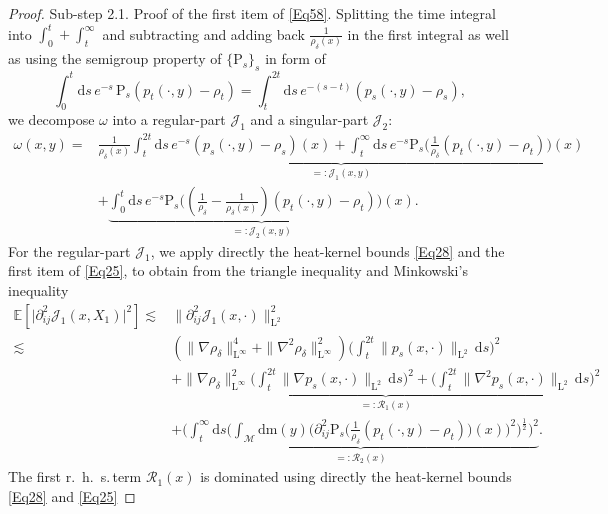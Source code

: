 \documentclass[11pt,a4paper,oneside]{amsart}
\numberwithin{equation}{section}
\newcommand{\dd}{\mathrm{d}}
\newcommand{\LL}{\mathrm{L}}
\newcommand{\rhs}{r.~h.~s.\,}
\newcommand{\pp}{\mathrm{P}}
\newcommand{\m}{\mathrm{m}}
\begin{document}
\begin{proof}
%
\medskip
%

{\sc Sub-step 2.1. Proof of the first item of \eqref{Eq58}. }Splitting the time integral into $\int_{0}^t+\int_{t}^\infty$ and subtracting and adding back $\tfrac{1}{\rho_\delta(x)}$ in the first integral as well as using the semigroup property of $\{\pp_s\}_{s}$ in form of 
%
$$\int_0^t\dd s\, e^{-s}\,\pp_s(p_t(\cdot,y)-\rho_t)=\int_{t}^{2t}\dd s\, e^{-(s-t)}(p_s(\cdot,y)-\rho_s),$$
%
we decompose $\omega$ into a regular-part $\mathcal{J}_1$ and a singular-part $\mathcal{J}_2$: 
%
\begin{equation}\label{Eq68}
\begin{aligned}
\omega(x,y)=&\underbrace{\frac{1}{\rho_{\delta}(x)}\int_t^{2t} \dd s\, e^{-s}(p_s(\cdot,y)-\rho_{s})(x)
+\int_{t}^{\infty}\dd s\, e^{-s}\text{P}_s\Big(\tfrac{1}{\rho_\delta}(p_t(\cdot,y)-\rho_t)\Big)(x)}_{=:\mathcal{J}_1(x,y)}\\
&+\underbrace{\int_{0}^{t}\dd s\, e^{-s}\text{P}_s\Big((\tfrac{1}{\rho_\delta}-\tfrac{1}{\rho_\delta(x)})(p_t(\cdot,y)-\rho_t)\Big)(x)}_{=:\mathcal{J}_2(x,y)}.
\end{aligned}
\end{equation}
%
For the regular-part $\mathcal{J}_1$, we apply directly the heat-kernel bounds \eqref{Eq28} and the first item of \eqref{Eq25}, to obtain from the triangle inequality and Minkowski's inequality
%
\begin{equation}\label{Eq61}
\begin{aligned}
\mathbb{E}[\vert\partial^2_{ij}\mathcal{J}_1(x,X_1)\vert^2]\lesssim& \|\partial^2_{ij}\mathcal{J}_1(x,\cdot)\|^2_{\LL^{2}}\\
\lesssim &(\|\nabla\rho_{\delta}\|^4_{\LL^{\infty}}+\|\nabla^2\rho_{\delta}\|^2_{\LL^{\infty}})\Big(\int_{t}^{2t}\|p_s(x,\cdot)\|_{\LL^{2}}\,\dd s\Big)^{2}\\
&\underbrace{+\|\nabla\rho_{\delta}\|^2_{\LL^{\infty}}\Big(\int_{t}^{2t}\|\nabla p_s(x,\cdot)\|_{\LL^{2}}\,\dd s\Big)^{2}+\Big(\int_{t}^{2t}\|\nabla^2 p_s(x,\cdot)\|_{\LL^{2}}\,\dd s\Big)^{2}}_{=:\mathcal{R}_1(x)}\\
&+\underbrace{\bigg(\int_{t}^{\infty}\dd s\bigg(\int_{\mathcal{M}}\dd \m(y)\Big(\partial^2_{ij}\text{P}_s\Big(\tfrac{1}{\rho_{\delta}}(p_t(\cdot,y)-\rho_t)\Big)(x)\Big)^2\bigg)^{\frac{1}{2}}\bigg)^2}_{=:\mathcal{R}_2(x)}.
\end{aligned}
\end{equation}
%
The first \rhs term $\mathcal{R}_1(x)$ is dominated using directly the heat-kernel bounds \eqref{Eq28} and \eqref{Eq25}
%

\end{proof}
\end{document}
